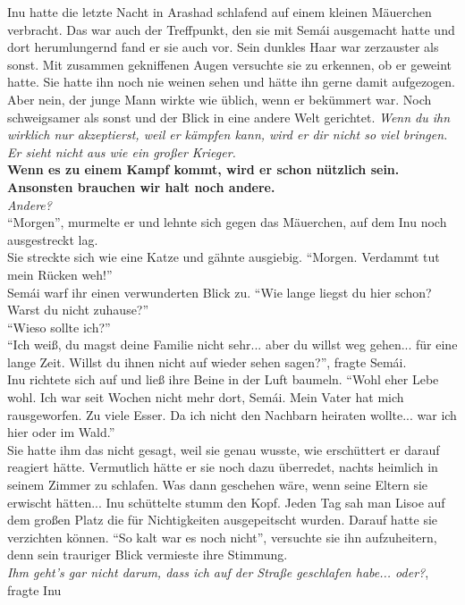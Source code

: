 Inu hatte die letzte Nacht in Arashad schlafend auf einem kleinen Mäuerchen verbracht. Das war auch 
der Treffpunkt, den sie mit Semái ausgemacht hatte und dort herumlungernd fand er sie auch vor. 
Sein dunkles Haar war zerzauster als sonst. Mit zusammen gekniffenen Augen versuchte sie zu 
erkennen, ob er geweint hatte. Sie hatte ihn noch nie weinen sehen und hätte ihn gerne damit 
aufgezogen. Aber nein, der junge Mann wirkte wie üblich, wenn er bekümmert war. Noch schweigsamer 
als sonst und der Blick in eine andere Welt gerichtet. \textit{Wenn du ihn wirklich nur 
akzeptierst, weil er kämpfen kann, wird er dir nicht so viel bringen. Er sieht nicht aus wie ein 
großer Krieger.}\\
\textbf{Wenn es zu einem Kampf kommt, wird er schon nützlich sein. Ansonsten brauchen wir halt noch 
andere.}\\
\textit{Andere?}\\
``Morgen'', murmelte er und lehnte sich gegen das Mäuerchen, auf dem Inu noch ausgestreckt lag. \\
Sie streckte sich wie eine Katze und gähnte ausgiebig. ``Morgen. Verdammt tut mein Rücken weh!''\\
Semái warf ihr einen verwunderten Blick zu. ``Wie lange liegst du hier schon? Warst du nicht 
zuhause?''\\
``Wieso sollte ich?''\\
``Ich weiß, du magst deine Familie nicht sehr... aber du willst weg gehen... für eine lange Zeit. 
Willst du ihnen nicht auf wieder sehen sagen?'', fragte Semái.\\
Inu richtete sich auf und ließ ihre Beine in der Luft baumeln. ``Wohl eher Lebe wohl. Ich war seit 
Wochen nicht mehr dort, Semái. Mein Vater hat mich rausgeworfen. Zu viele Esser. Da ich nicht den 
Nachbarn heiraten wollte... war ich hier oder im Wald.''\\
Sie hatte ihm das nicht gesagt, weil sie genau wusste, wie erschüttert er darauf reagiert hätte. 
Vermutlich hätte er sie noch dazu überredet, nachts heimlich in seinem Zimmer zu schlafen. Was dann 
geschehen wäre, wenn seine Eltern sie erwischt hätten... Inu schüttelte stumm den Kopf. Jeden Tag 
sah man Lisoe auf dem großen Platz die für Nichtigkeiten ausgepeitscht wurden. Darauf hatte sie 
verzichten können. ``So kalt war es noch nicht'', versuchte sie ihn aufzuheitern, denn sein 
trauriger Blick vermieste ihre Stimmung.\\
\textit{Ihm geht's gar nicht darum, dass ich auf der Straße geschlafen habe... oder?}, fragte Inu 

